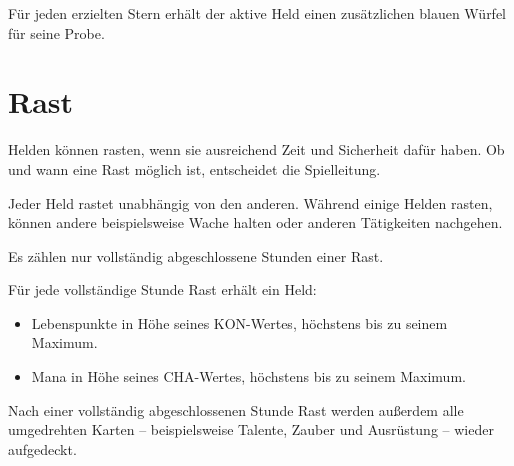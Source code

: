 Für jeden erzielten Stern erhält der aktive Held einen zusätzlichen blauen Würfel für seine Probe.

\section{Rast}

Helden können rasten, wenn sie ausreichend Zeit und Sicherheit dafür haben. Ob und wann eine Rast möglich ist, entscheidet die Spielleitung.

Jeder Held rastet unabhängig von den anderen. Während einige Helden rasten, können andere beispielsweise Wache halten oder anderen Tätigkeiten nachgehen.

Es zählen nur vollständig abgeschlossene Stunden einer Rast.

Für jede vollständige Stunde Rast erhält ein Held:

\begin{itemize}
  \item Lebenspunkte in Höhe seines KON-Wertes, höchstens bis zu seinem Maximum.
  \item Mana in Höhe seines CHA-Wertes, höchstens bis zu seinem Maximum.
\end{itemize}

Nach einer vollständig abgeschlossenen Stunde Rast werden außerdem alle umgedrehten Karten -- beispielsweise Talente, Zauber und Ausrüstung -- wieder aufgedeckt.
